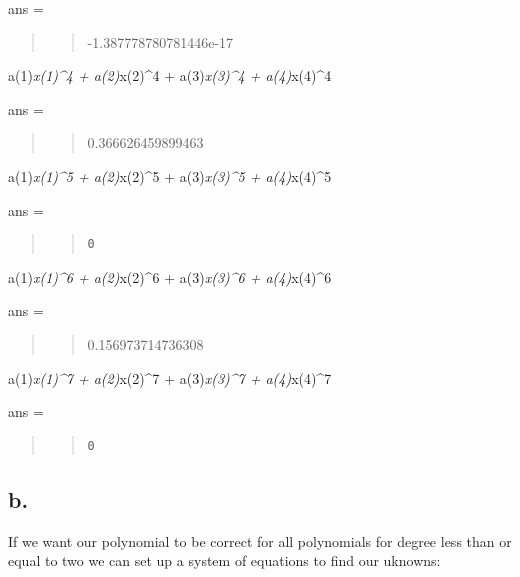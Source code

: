 \documentclass[]{article}
\begin{document}
ans =

\begin{quote}
\begin{quote}
-1.387778780781446e-17
\end{quote}
\end{quote}

a(1)\emph{x(1)\^{}4 + a(2)}x(2)\^{}4 + a(3)\emph{x(3)\^{}4 +
a(4)}x(4)\^{}4

ans =

\begin{quote}
\begin{quote}
0.366626459899463
\end{quote}
\end{quote}

a(1)\emph{x(1)\^{}5 + a(2)}x(2)\^{}5 + a(3)\emph{x(3)\^{}5 +
a(4)}x(4)\^{}5

ans =

\begin{quote}
\begin{quote}
\begin{verbatim}
0
\end{verbatim}
\end{quote}
\end{quote}

a(1)\emph{x(1)\^{}6 + a(2)}x(2)\^{}6 + a(3)\emph{x(3)\^{}6 +
a(4)}x(4)\^{}6

ans =

\begin{quote}
\begin{quote}
0.156973714736308
\end{quote}
\end{quote}

a(1)\emph{x(1)\^{}7 + a(2)}x(2)\^{}7 + a(3)\emph{x(3)\^{}7 +
a(4)}x(4)\^{}7

ans =

\begin{quote}
\begin{quote}
\begin{verbatim}
0
\end{verbatim}
\end{quote}
\end{quote}

\subsection{b.}\label{b.}

If we want our polynomial to be correct for all polynomials for degree
less than or equal to two we can set up a system of equations to find
our uknowns:
\end{document}
